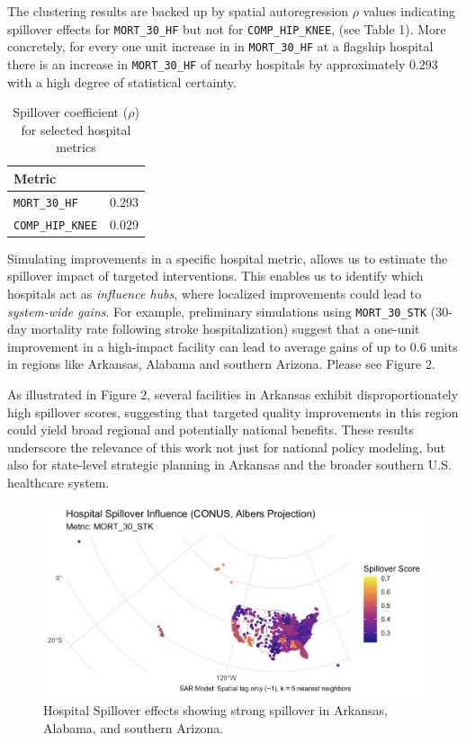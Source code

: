 \documentclass[10pt]{article}
\begin{document}
The clustering results are backed up by spatial autoregression $\rho$ values indicating spillover effects for \texttt{MORT\_30\_HF} but not for \texttt{COMP\_HIP\_KNEE}, (see Table 1). More concretely, for every one unit increase in in \texttt{MORT\_30\_HF} at a flagship hospital there is an increase in \texttt{MORT\_30\_HF} of nearby hospitals by approximately $0.293$ with a high degree of statistical certainty.
\begin{table}
\centering
\caption{Spillover coefficient ($\rho$) for selected hospital metrics}
\begin{tabular}{@{}ll@{}}
\toprule
\textbf{Metric} & \boldmath{$\rho$} \\
\midrule
\texttt{MORT\_30\_HF} & 0.293 \\
\texttt{COMP\_HIP\_KNEE} & 0.029 \\
\bottomrule
\end{tabular}
\label{tab:spatial-autocorr}
\end{table}
\indent Simulating improvements in a specific hospital metric, allows us to estimate the spillover impact of targeted interventions. This enables us to identify which hospitals act as \textit{influence hubs}, where localized improvements could lead to \textit{system-wide gains}. For example, preliminary simulations using \texttt{MORT\_30\_STK} (30-day mortality rate following stroke hospitalization) suggest that a one-unit improvement in a high-impact facility can lead to average gains of up to 0.6 units in regions like Arkansas, Alabama and southern Arizona. Please see Figure 2.

As illustrated in Figure 2, several facilities in Arkansas exhibit disproportionately high spillover scores, suggesting that targeted quality improvements in this region could yield broad regional and potentially national benefits. These results underscore the relevance of this work not just for national policy modeling, but also for state-level strategic planning in Arkansas and the broader southern U.S. healthcare system.

\begin{figure}
  \centering
  \includegraphics[scale = 0.35]{hospital-spillovers.png}
  \caption{Hospital Spillover effects showing strong spillover in Arkansas, Alabama, and southern Arizona.}
  \label{fig:wrap}
\end{figure}
\end{document}
